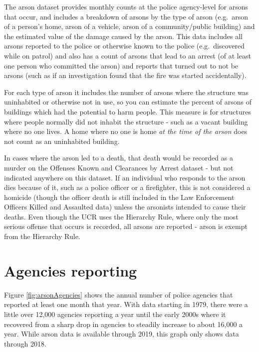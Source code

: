 \documentclass[
  12pt,
  openany]{book}
\begin{document}
The arson dataset provides monthly counts at the police agency-level for arsons that occur, and includes a breakdown of arsons by the type of arson (e.g.~arson of a person's home, arson of a vehicle, arson of a community/public building) and the estimated value of the damage caused by the arson. This data includes all arsons reported to the police or otherwise known to the police (e.g.~discovered while on patrol) and also has a count of arsons that lead to an arrest (of at least one person who committed the arson) and reports that turned out to not be arsons (such as if an investigation found that the fire was started accidentally).

For each type of arson it includes the number of arsons where the structure was uninhabited or otherwise not in use, so you can estimate the percent of arsons of buildings which had the potential to harm people. This measure is for structures where people normally did not inhabit the structure - such as a vacant building where no one lives. A home where no one is home \emph{at the time of the arson} does not count as an uninhabited building.

In cases where the arson led to a death, that death would be recorded as a murder on the Offenses Known and Clearances by Arrest dataset - but not indicated anywhere on this dataset. If an individual who responds to the arson dies because of it, such as a police officer or a firefighter, this is not considered a homicide (though the officer death is still included in the Law Enforcement Officers Killed and Assaulted data) unless the arsonists intended to cause their deaths. Even though the UCR uses the Hierarchy Rule, where only the most serious offense that occurs is recorded, all arsons are reported - arson is exempt from the Hierarchy Rule.

\hypertarget{agencies-reporting-2}{%
\section{Agencies reporting}\label{agencies-reporting-2}}

Figure \ref{fig:arsonAgencies} shows the annual number of police agencies that reported at least one month that year. With data starting in 1979, there were a little over 12,000 agencies reporting a year until the early 2000s where it recovered from a sharp drop in agencies to steadily increase to about 16,000 a year. While arson data is available through 2019, this graph only shows data through 2018.
\end{document}
